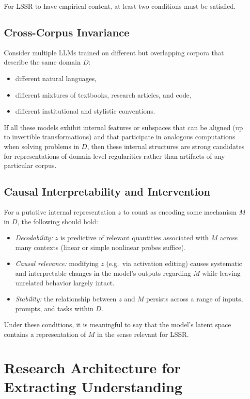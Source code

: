 \documentclass[11pt]{article}
\begin{document}
	For LSSR to have empirical content, at least two conditions must be satisfied.
	
	\subsection{Cross-Corpus Invariance}
	
	Consider multiple LLMs trained on different but overlapping corpora that describe the same domain $D$:
	\begin{itemize}[nosep]
		\item different natural languages,
		\item different mixtures of textbooks, research articles, and code,
		\item different institutional and stylistic conventions.
	\end{itemize}
	If all these models exhibit internal features or subspaces that can be aligned (up to invertible transformations) and that participate in analogous computations when solving problems in $D$, then these internal structures are strong candidates for representations of domain-level regularities rather than artifacts of any particular corpus.
	
	\subsection{Causal Interpretability and Intervention}
	
	For a putative internal representation $z$ to count as encoding some mechanism $M$ in $D$, the following should hold:
	\begin{itemize}[nosep]
		\item \emph{Decodability:} $z$ is predictive of relevant quantities associated with $M$ across many contexts (linear or simple nonlinear probes suffice).
		\item \emph{Causal relevance:} modifying $z$ (e.g.\ via activation editing) causes systematic and interpretable changes in the model's outputs regarding $M$ while leaving unrelated behavior largely intact.
		\item \emph{Stability:} the relationship between $z$ and $M$ persists across a range of inputs, prompts, and tasks within $D$.
	\end{itemize}
	
	Under these conditions, it is meaningful to say that the model's latent space contains a representation of $M$ in the sense relevant for LSSR.
	
	\section{Research Architecture for Extracting Understanding}
	
\end{document}
